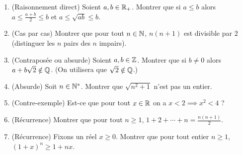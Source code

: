 \begin{frame}
\begin{miniexercice}
\begin{enumerate}
  \item (Raisonnement direct) Soient $a,b \in \mathbb{R}_+$. Montrer que si $a \le b$ alors $a \le \frac{a+b}{2} \le b$ et
$a \le \sqrt{ab} \le b$.
  \item (Cas par cas) Montrer que pour tout $n\in \mathbb{N}$, $n(n+1)$ est divisible par $2$ (distinguer
les $n$ pairs des $n$ impairs).
  \item (Contraposée ou absurde) Soient $a,b \in \mathbb{Z}$. Montrer que si $b\neq 0$ alors
$a+b\sqrt{2} \notin \mathbb{Q}$. (On utilisera que $\sqrt 2 \notin \mathbb{Q}$.)
  \item (Absurde) Soit $n \in\mathbb{N}^*$. Montrer que $\sqrt{n^2+1}$ n'est pas un entier.
  \item (Contre-exemple) Est-ce que pour tout $x\in \mathbb{R}$ on a $x<2 \implies x^2<4$ ?
  \item (Récurrence) Montrer que pour tout $n \ge 1$, $1+2+ \cdots +n = \frac{n(n+1)}{2}$.
  \item (Récurrence) Fixons un réel $x\ge 0$. Montrer que pour tout entier $n \ge 1$, \ \  $(1+x)^n \ge 1+nx$.
\end{enumerate}  
\end{miniexercice}



\end{frame}

